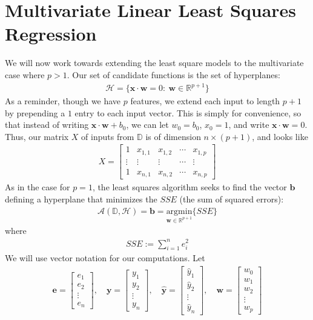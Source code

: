 \documentclass[12pt, a4paper]{article}
\theoremstyle{definition}
\begin{document}
	\section*{Multivariate Linear Least Squares Regression}
	We will now work towards extending the least square models to the multivariate
	case where $p>1$. Our set of candidate functions is the set of hyperplanes:
	\begin{align*}
		\mathcal{H} = \{\mathbf{x}\cdot \mathbf{w}=0:\ \mathbf{w}\in \mathbb{R}^{p+1}\}
	\end{align*}
	As a reminder, though we have $p$ features, we extend each input to length
	$p+1$ by prepending a $1$ entry to each input vector. This is simply
	for convenience, so that instead of writing $\mathbf{x}\cdot \mathbf{w}+b_0$,
	we can let $w_0=b_0$, $x_0=1$, and write $\mathbf{x}\cdot \mathbf{w}=0$.
	Thus, our matrix $X$ of inputs from $\mathbb{D}$ is of dimension $n\times (p+1)$,
	and looks like
	\begin{align*}
		X = \begin{bmatrix}
			1 & x_{1, 1} & x_{1, 2} & \cdots & x_{1, p}\\
			\vdots & \vdots & \vdots  &\cdots & \vdots\\
			1 & x_{n, 1} & x_{n, 2} & \cdots &  x_{n, p}
		\end{bmatrix}
	\end{align*}
	As in the case for $p=1$, the least squares algorithm seeks to find the
	vector $\mathbf{b}$ defining a hyperplane that minimizes the $SSE$ (the sum of
	squared errors):
	\begin{align*}
	\mathcal{A}(\mathbb{D}, \mathcal{H}) = \mathbf{b} =
	\underset{\mathbf{w}\in\mathbb{R}^{p+1}}{\text{argmin}}
	\{SSE\}
	\end{align*}
	where
	\begin{align*}
		SSE := \sum_{i=1}^{n}e_i^2
	\end{align*}
	We will use vector notation for our computations. Let
	\begin{align*}
		\mathbf{e} = \begin{bmatrix}
			e_1 \\
			e_2\\
			\vdots\\
			e_n
		\end{bmatrix},\quad
		\mathbf{y} = \begin{bmatrix}
			y_1 \\
			y_2\\
			\vdots\\
			y_n
		\end{bmatrix},\quad
		\mathbf{\hat{y}} = \begin{bmatrix}
			\hat{y}_1 \\
			\hat{y}_2\\
			\vdots\\
			\hat{y}_n
		\end{bmatrix},\quad
		\mathbf{w} = \begin{bmatrix}
			w_0\\
			w_1 \\
			w_2\\
			\vdots\\
			w_p
		\end{bmatrix}
	\end{align*}
\end{document}
